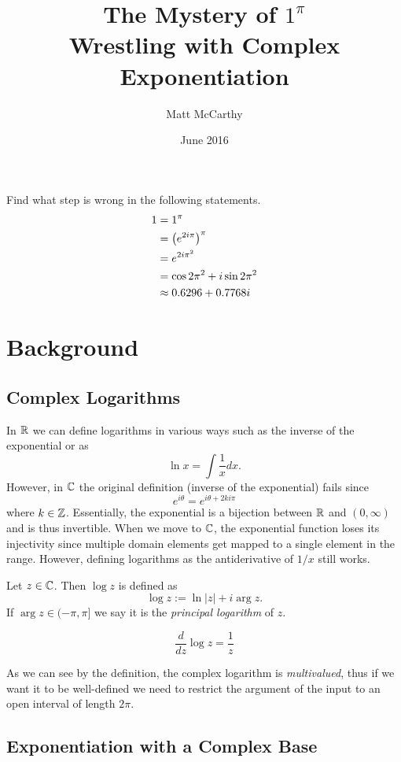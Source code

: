 \documentclass[notitlepage]{problem-solving}
\title{The Mystery of $1^\pi$\\ Wrestling with Complex Exponentiation}
\author{Matt McCarthy}
\date{June 2016}
\begin{document}
\maketitle

\begin{problem*}
	Find what step is wrong in the following statements.
	\begin{align*}
		1 &= 1^\pi\\
		&= \left( e^{2i\pi} \right)^\pi\\
		&=e^{2i\pi^2}\\
		&=\cos 2\pi^2 + i\sin 2\pi^2\\
		&\approx 0.6296 +0.7768 i
	\end{align*}
\end{problem*}

\section{Background}

\subsection{Complex Logarithms}

In $\mathbb{R}$ we can define logarithms in various ways such as the inverse of the exponential or as
\[
	\ln x = \int \frac{1}{x} dx.
\]
However, in $\mathbb{C}$ the original definition (inverse of the exponential) fails since
\[
	e^{i\theta} = e^{i\theta + 2ki\pi}
\]
where $k\in\mathbb{Z}$.
Essentially, the exponential is a bijection between $\mathbb{R}$ and $(0,\infty)$ and is thus invertible.
When we move to $\mathbb{C}$, the exponential function loses its injectivity since multiple domain elements get mapped to a single element in the range.
However, defining logarithms as the antiderivative of $1/x$ still works.
\begin{definition}
	Let $z\in\mathbb{C}$.
	Then $\log z$ is defined as
	\[
		\log z := \ln |z| +i\arg z.
	\]
	If $\arg z\in(-\pi,\pi]$ we say it is the \textit{principal logarithm} of $z$.
\end{definition}
\begin{corollary}
	\[
		\frac{d}{dz} \log z = \frac{1}{z}
	\]
\end{corollary}
As we can see by the definition, the complex logarithm is \textit{multivalued}, thus if we want it to be well-defined we need to restrict the argument of the input to an open interval of length $2\pi$.

\subsection{Exponentiation with a Complex Base}
\end{document}
